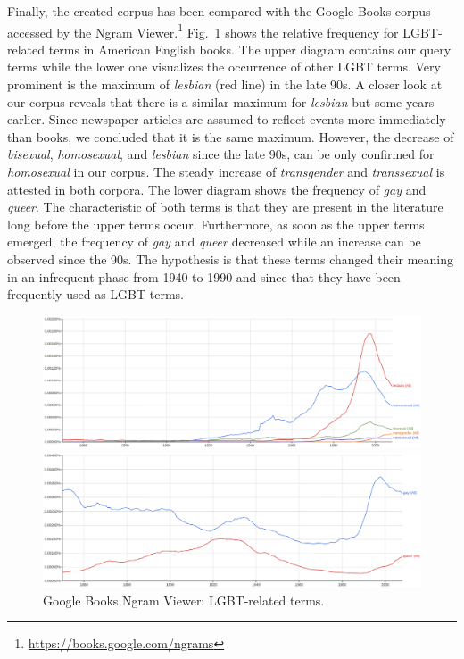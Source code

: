 \documentclass[10pt,a4paper,twocolumn]{scrartcl}
\begin{document}
Finally, the created corpus has been compared with the Google Books corpus accessed by the Ngram Viewer.\footnote{\url{https://books.google.com/ngrams}} Fig.~\ref{fig:google} shows the relative frequency for LGBT-related terms in American English books. The upper diagram contains our query terms while the lower one visualizes the occurrence of other LGBT terms. Very prominent is the maximum of \textit{lesbian} (red line) in the late 90s. A closer look at our corpus reveals that there is a similar maximum for \textit{lesbian} but some years earlier. Since newspaper articles are assumed to reflect events more immediately than books, we concluded that it is the same maximum. However, the decrease of \textit{bisexual}, \textit{homosexual}, and \textit{lesbian} since the late 90s, can be only confirmed for \textit{homosexual} in our corpus. The steady increase of \textit{transgender} and \textit{transsexual} is attested in both corpora. The lower diagram shows the frequency of \textit{gay} and \textit{queer}. The characteristic of both terms is that they are present in the literature long before the upper terms occur. Furthermore, as soon as the upper terms emerged, the frequency of \textit{gay} and \textit{queer} decreased while an increase can be observed since the 90s. The hypothesis is that these terms changed their meaning in an infrequent phase from 1940 to 1990 and since that they have been frequently used as LGBT terms.

\begin{figure}
\centering
\includegraphics[width=\textwidth]{figures/google_queryterms}

\vspace*{1cm}

\includegraphics[width=\textwidth]{figures/google_others}
\caption{Google Books Ngram Viewer: LGBT-related terms.} \label{fig:google}
\end{figure}
\end{document}
